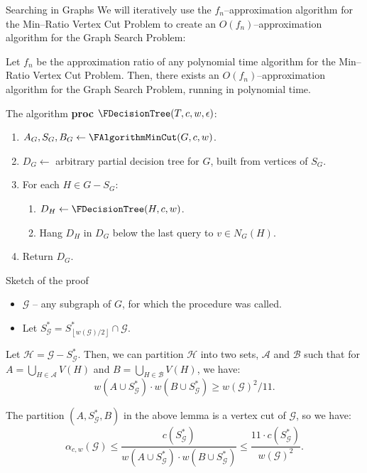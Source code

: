 \documentclass{beamer}
\newcommand{\br}[1]{\mathopen{}\left( #1 \right)}
\newcommand{\fl}[1]{\mathopen{}\left\lfloor #1 \right\rfloor}
\begin{document}
\begin{frame}{Searching in Graphs}
We will iteratively use the $f_n$–approximation algorithm for the Min–Ratio Vertex Cut Problem to create an $O\br{f_n}$–approximation algorithm for the Graph Search Problem:
\begin{theorem}
    Let $f_n$ be the approximation ratio of any polynomial time algorithm for the Min–Ratio Vertex Cut Problem. Then, there exists an $O\br{f_n}$–approximation algorithm for the Graph Search Problem, running in polynomial time.
\end{theorem}
    
\end{frame}

\begin{frame}{The algorithm}
\textbf{proc} $\FDecisionTree\br{T,c,w,\epsilon}$:
\begin{enumerate}
    \item $A_G,S_G, B_G\gets\FAlgorithmMinCut\br{G, c, w}$.
    \item $D_G\gets$ arbitrary partial decision tree for $G$, built from vertices of $S_G$.
    \item For each $H\in G-S_G$:
    \begin{enumerate}
        \item $D_H\gets \FDecisionTree\br{H, c, w}$.
        \item Hang $D_H$ in $D_G$ below the last query to $v\in N_G\br{H}$.
    \end{enumerate}
    \item Return $D_G$.
\end{enumerate}
\end{frame}

\begin{frame}{Sketch of the proof}

    \begin{itemize}
        \item $\mathcal{G}$ – any subgraph of $G$, for which the procedure was called.
        \item Let $S_{\mathcal{G}}^*=S_{\fl{w\br{\mathcal{G}}/2}}^*\cap \mathcal{G}$.
    \end{itemize}
        \pause
        \begin{lemma}\label{lambda_lemma}
            Let $\mathcal{H}=\mathcal{G}-S_{\mathcal{G}}^*$. Then, we can partition $\mathcal{H}$ into two sets, $\mathcal{A}$ and $\mathcal{B}$ such that for $A=\bigcup_{H\in\mathcal{A}}V\br{H}$ and $B=\bigcup_{H\in\mathcal{B}}V\br{H}$, we have:
            $$w\br{A\cup S_{\mathcal{G}}^*}\cdot w\br{B\cup S_{\mathcal{G}}^*}\geq w\br{\mathcal{G}}^2/11.$$
        \end{lemma}
        The partition $\br{A,S_{\mathcal{G}}^*,B}$ in the above lemma is a vertex cut of $\mathcal{G}$, so we have:
                $$\alpha_{c,w}\br{\mathcal{G}}\leq \frac{c\br{S_{\mathcal{G}}^*}}{w\br{A\cup S_{\mathcal{G}}^*}\cdot w\br{B\cup S_{\mathcal{G}}^*}}\leq \frac{11 \cdot c\br{S_{\mathcal{G}}^*}}{w\br{\mathcal{G}}^2}.
                $$
    \end{frame}
\end{document}
